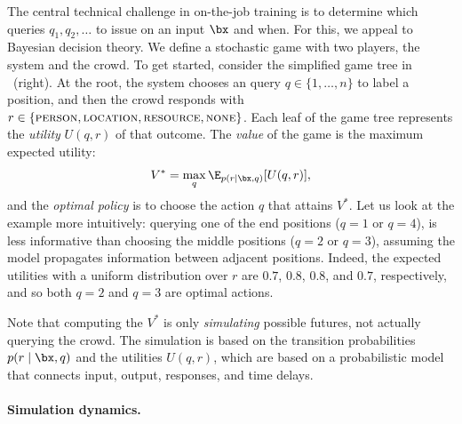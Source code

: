 The central technical challenge in on-the-job training
is to determine which queries $q_1, q_2, \dots$ to issue on an input $\bx$
and when. For this, we appeal to Bayesian decision theory.
We define a stochastic game with two players, the system and the crowd.
To get started, consider the simplified game tree in ~(right).
At the root, the system chooses an query $q \in \{1, \dots, n\}$ to label a position,
and then the crowd responds with $r \in \{ \textsc{person}{}, \textsc{location}{}, \textsc{resource}{}, \textsc{none}{} \}$.
Each leaf of the game tree represents the \emph{utility} $U(q, r)$ of that outcome.
The \emph{value} of the game is the maximum expected utility:
\begin{align}
  V^* = \max_q \E_{p(r \mid \bx, q)}[U(q, r)],
\end{align}
and the \emph{optimal policy} is to choose the action $q$ that attains $V^*$.
Let us look at the example more intuitively:
querying one of the end positions ($q = 1$ or $q = 4$),
is less informative than choosing the middle positions ($q = 2$ or $q = 3$),
assuming the model propagates information between adjacent positions.
Indeed, the expected utilities with a uniform distribution over $r$
are $0.7$, $0.8$, $0.8$, and $0.7$, respectively, and so both $q = 2$ and $q = 3$ are optimal actions.

Note that computing the $V^*$ is only \emph{simulating} possible futures,
not actually querying the crowd.  The simulation is based on the transition
probabilities $p(r \mid \bx, q)$ and the utilities $U(q, r)$, which are
based on a probabilistic model that connects input, output, responses, and time delays.

\paragraph{Simulation dynamics.}

